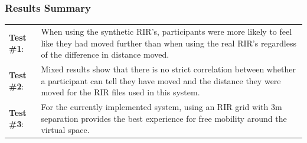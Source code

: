 \documentclass[../../main.tex]{subfiles}
\begin{document}
			\subsubsection{Results Summary}

				\begin{tabular}{l p{} }
					\textbf{Test \#1}: & When using the synthetic \ac{RIR}'s, participants were more likely to feel like they had moved further than when using the real \ac{RIR}'s regardless of the difference in distance moved. \\
					\textbf{Test \#2}: & Mixed results show that there is no strict correlation between whether a participant can tell they have moved and the distance they were moved for the \ac{RIR} files used in this system. \\
					\textbf{Test \#3}: & For the currently implemented system, using an \ac{RIR} grid with 3m separation provides the best experience for free mobility around the virtual space.
				\end{tabular}


			
\end{document}
